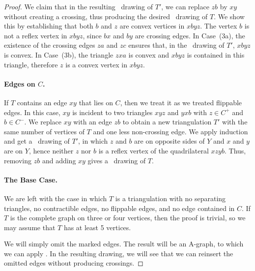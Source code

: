 \begin{proof}
We claim that in the resulting \Fary\ drawing of $T'$,
we can replace $zb$ by $xy$ without creating a crossing, thus producing
 the desired \Fary\ drawing of $T$.
%
We show this by establishing that both $b$ and $z$ are convex vertices in $xbyz$.
The vertex $b$ is not a reflex vertex in $xbyz$, since $bx$ and $by$ are crossing
edges.
                In Case~(3a), the existence of the
	crossing edges $za$ and $zc$ ensures that, in the \Fary\ drawing of $T'$,
	$xbyz$ is convex. In Case~(3b), the triangle $zxa$ is convex
        and $xbyz$ is contained in this triangle, therefore $z$ is
        a convex  vertex in $xbyz$.
	
	\paragraph{Edges on $C$.}
	
	If $T$ contains an edge $xy$ that lies on $C$, then we treat it as we treated flippable edges. In this case, $xy$ is incident to two triangles $xyz$ and $yxb$ with $z\in C^+$ and $b\in C^-$. We replace $xy$ with an edge $zb$ to obtain a new triangulation $T'$ with the same number of vertices of $T$ and one less non-crossing edge. We apply induction and get a \Fary\ drawing of $T'$, in which $z$ and $b$ are
	on opposite sides of $Y$ and $x$ and $y$ are on $Y$, hence 	neither $z$ nor $b$ is a reflex vertex of the quadrilateral $xzyb$.
	Thus, removing $zb$ and adding $xy$ gives a \Fary\ drawing of $T$.
	
	\paragraph{The Base Case.}
	
	We are left with the case in which $T$ is a triangulation
	with no separating triangles, no contractible edges, no flippable
	edges, and no edge contained in $C$.  If $T$ is the complete graph
	on three or four vertices, then the proof is trivial,
	so we may assume that $T$ has at least 5 vertices.

        We will simply omit the marked edges. The result will be an
        A-graph, to which we can apply . In the
        resulting drawing, we will see that we can reinsert the
        omitted edges without producing crossings.


\end{proof}

